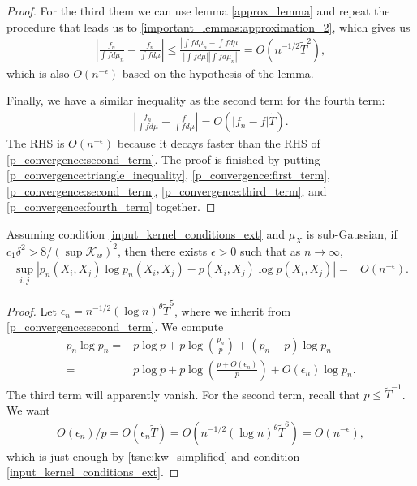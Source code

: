 \begin{proof}
    For the third them we can use lemma \ref{approx_lemma} and repeat the procedure
    that leads us to \eqref{important_lemmas:approximation_2}, which gives us
    \begin{align} \label{p_convergence:third_term}
        \left|\frac{f_n}{\int f d\mu_n} - \frac{f_n}{\int f d \mu}\right| \leq \frac{|\int f d \mu_n - \int f d \mu|}{|\int f d \mu||\int f d \mu_n|} = O(n^{-1/2}\tilde{T}^2),
    \end{align}
    which is also $O(n^{-\epsilon})$ based on the hypothesis of the lemma.

    Finally, we have a similar inequality as the second term for the fourth term:
    \begin{align} \label{p_convergence:fourth_term}
        \left|\frac{f_n}{\int f d\mu} - \frac{f}{\int f d \mu}\right| = O(|f_n-f|\tilde{T}).
    \end{align}
    The RHS is $O(n^{-\epsilon})$ because it decays faster than the RHS of \eqref{p_convergence:second_term}. The proof is finished by putting \eqref{p_convergence:triangle_inequality}, \eqref{p_convergence:first_term}, \eqref{p_convergence:second_term}, \eqref{p_convergence:third_term}, and \eqref{p_convergence:fourth_term} together.
\end{proof}
\begin{lemma} \label{tsne:plogp_convergence_lemma}
    Assuming condition \ref{input_kernel_conditions_ext} and $\mu_X$ is sub-Gaussian, if $c_1\delta^2 > 8/(\sup \mathcal{K}_w)^2$, then there exists $\epsilon>0$ such that as $n \to \infty$,
    \begin{align}
        \sup_{i,j}|p_n(X_i,X_j)\log p_n(X_i,X_j) - p(X_i,X_j)\log p(X_i,X_j)| = & O(n^{-\epsilon}). \nonumber
    \end{align}
\end{lemma}
\begin{proof}
    Let $\epsilon_n = n^{-1/2} (\log n)^{\theta}\tilde{T}^5$, where we inherit from \eqref{p_convergence:second_term}. We compute
    \begin{align}
        p_n \log p_n = & p \log p + p \log \left(\frac{p_n}{p}\right) + (p_n-p)\log p_n \nonumber           \\
        =              & p \log p + p \log \left(\frac{p+ O(\epsilon_n)}{p}\right) + O(\epsilon_n)\log p_n.
    \end{align}
    The third term will apparently vanish. For the second term, recall that $p \leq \tilde{T}^{-1}$. We want
    \begin{align} \label{p_convergence:entropy_bound}
        O(\epsilon_n)/p = O(\epsilon_n \tilde{T}) = O(n^{-1/2} (\log n)^{\theta}\tilde{T}^6) = O(n^{-\epsilon}),
    \end{align}
    which is just enough by \eqref{tsne:kw_simplified} and condition \ref{input_kernel_conditions_ext}.
\end{proof}
